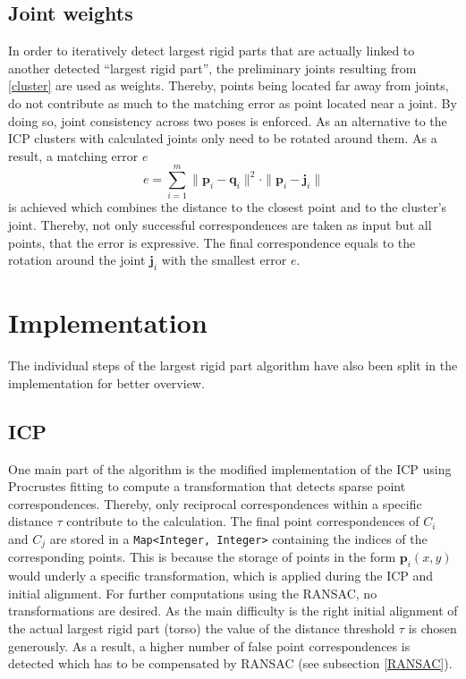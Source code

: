 \subsection{Joint weights}
\label{JointWeights}
In order to iteratively detect largest rigid parts that are actually linked to another detected ``largest rigid part'', the preliminary joints resulting from \ref{cluster} are used as weights. Thereby, points being located far away from joints, do not contribute as much to the matching error as point located near a joint. By doing so, joint consistency across two poses is enforced. As an alternative to the ICP clusters with calculated joints only need to be rotated around them. As a result, a matching error $e$ 
%
\begin{equation}
	e = \displaystyle\sum_{i=1}^{m}\| \boldsymbol{p}_i - \boldsymbol{q}_i\|^2 \cdot \| \boldsymbol{p}_i - \boldsymbol{j}_i\|
\end{equation}
%
is achieved which combines the distance to the closest point and to the cluster's joint. Thereby, not only successful correspondences are taken as input but all points, that the error is expressive. The final correspondence equals to the rotation around the joint $\boldsymbol{j}_i$ with the smallest error $e$. 

\section{Implementation}
\label{ImplementationLRP}
The individual steps of the largest rigid part algorithm have also been split in the implementation for better overview. 
%
%
\subsection{ICP}
One main part of the algorithm is the modified implementation of the ICP using Procrustes fitting to compute a transformation that detects sparse point correspondences. Thereby, only reciprocal correspondences within a specific distance $\tau$ contribute to the calculation. The final point correspondences of $C_i$ and $C_j$ are stored in a \texttt{Map<Integer, Integer>} containing the indices of the corresponding points. This is because the storage of points in the form $\boldsymbol{p}_i(x,y)$ would underly a specific transformation, which is applied during the ICP and initial alignment. For further computations using the RANSAC, no transformations are desired. As the main difficulty is the right initial alignment of the actual largest rigid part (torso) the value of the distance threshold $\tau$ is chosen generously. As a result, a higher number of false point correspondences is detected which has to be compensated by RANSAC (see subsection \ref{RANSAC}).

